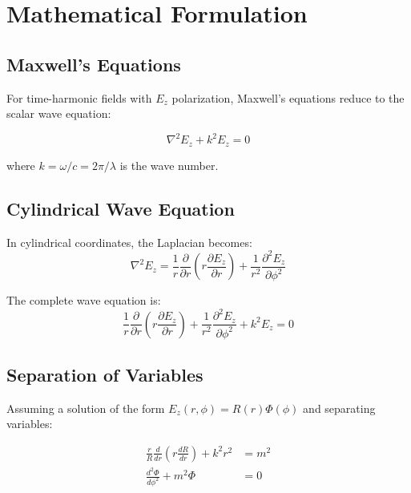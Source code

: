 \documentclass[11pt,a4paper]{article}
\begin{document}
\section{Mathematical Formulation}

\subsection{Maxwell's Equations}

For time-harmonic fields with $E_z$ polarization, Maxwell's equations reduce to the scalar wave equation:

\begin{equation}
\nabla^2 E_z + k^2 E_z = 0 \label{eq:wave_equation}
\end{equation}

where $k = \omega/c = 2\pi/\lambda$ is the wave number.

\subsection{Cylindrical Wave Equation}

In cylindrical coordinates, the Laplacian becomes:
\begin{equation}
\nabla^2 E_z = \frac{1}{r}\frac{\partial}{\partial r}\left(r \frac{\partial E_z}{\partial r}\right) + \frac{1}{r^2}\frac{\partial^2 E_z}{\partial \phi^2} \label{eq:laplacian_cyl}
\end{equation}

The complete wave equation is:
\begin{equation}
\frac{1}{r}\frac{\partial}{\partial r}\left(r \frac{\partial E_z}{\partial r}\right) + \frac{1}{r^2}\frac{\partial^2 E_z}{\partial \phi^2} + k^2 E_z = 0 \label{eq:helmholtz_cyl}
\end{equation}

\subsection{Separation of Variables}

Assuming a solution of the form $E_z(r,\phi) = R(r)\Phi(\phi)$ and separating variables:

\begin{align}
\frac{r}{R}\frac{d}{dr}\left(r \frac{dR}{dr}\right) + k^2 r^2 &= m^2 \label{eq:radial_separated} \\
\frac{d^2\Phi}{d\phi^2} + m^2 \Phi &= 0 \label{eq:angular_separated}
\end{align}
\end{document}
